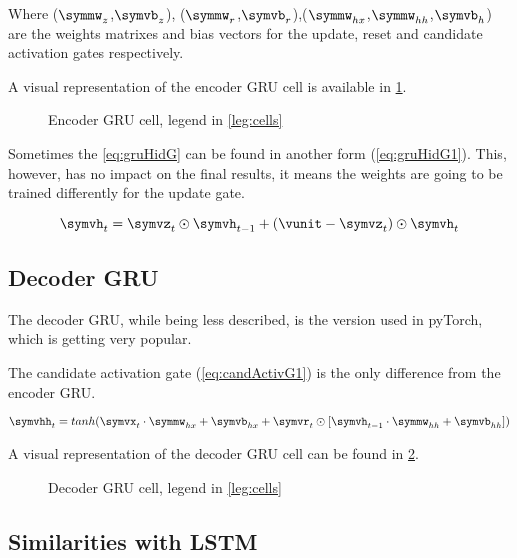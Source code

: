 Where ($\symmw_z$,$\symvb_z$), ($\symmw_r$,$\symvb_r$),($\symmw_{hx}$,$\symmw_{hh}$,$\symvb_h$) are the weights matrixes and bias vectors for the update, reset and candidate activation gates respectively.

A visual representation of the encoder \ac{GRU} cell is available in \cref{fig:encoderGruCell}.

\begin{figure}[H]
  \centering
  
  \caption{Encoder \acs{GRU} cell, legend in \cref{leg:cells}}
  \label{fig:encoderGruCell}
\end{figure}

Sometimes the \cref{eq:gruHidG} can be found in another form (\cref{eq:gruHidG1})\cite{gruPyTorch}. This, however, has no impact on the final results, it means the weights are going to be trained differently for the update gate.

\begin{equation}\label{eq:gruHidG1}
  \symvh_t=\symvz_t\odot \symvh_{t-1} + (\vunit-\symvz_t)\odot \symvh_t
\end{equation}

\subsection{Decoder \ac{GRU}}

The decoder \ac{GRU}, while being less described, is the version used in pyTorch, which is getting very popular.

The candidate activation gate (\cref{eq:candActivG1}) is the only difference from the encoder \ac{GRU}.

\begin{equation}\label{eq:candActivG1}
  \symvhh_t=tanh(\symvx_t\cdot \symmw_{hx}+ \symvb_{hx}+\symvr_t\odot[\symvh_{t-1} \cdot \symmw_{hh} + \symvb_{hh}])
\end{equation}

A visual representation of the decoder \ac{GRU} cell can be found in \cref{fig:decoderGruCell}.

\begin{figure}[H]
  \centering
  
  \caption{Decoder \acs{GRU} cell, legend in \cref{leg:cells}}
  \label{fig:decoderGruCell}
\end{figure}

\subsection{Similarities with \ac{LSTM}}

